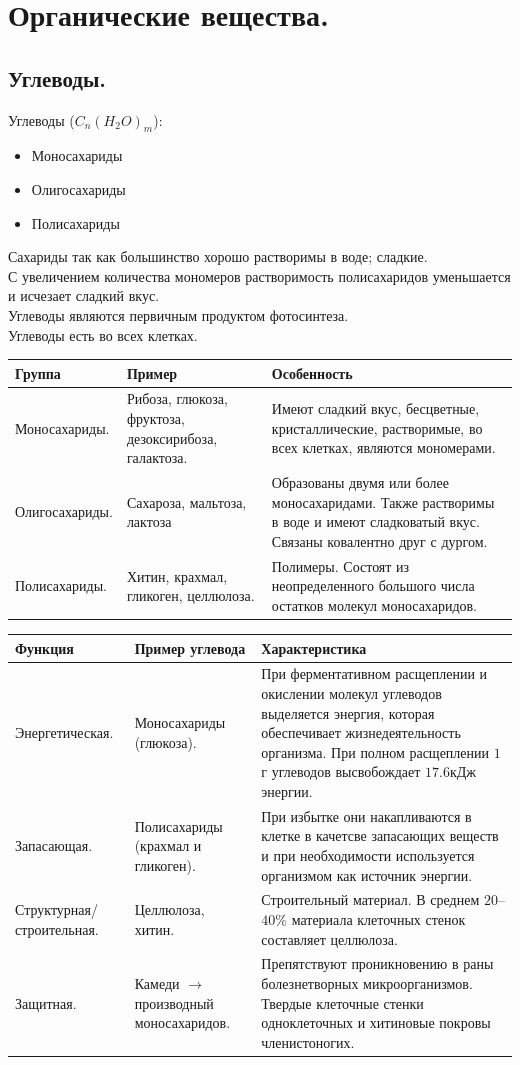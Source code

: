 \documentclass[12pt]{article}
\begin{document}
	\section{Органические вещества.}
	\subsection{Углеводы.}
	Углеводы ($C_n(H_2O)_m$):
	\begin{itemize}
		\item Моносахариды
		\item Олигосахариды
		\item Полисахариды
	\end{itemize}
	Сахариды так как большинство хорошо растворимы в воде; сладкие. \\
	С увеличением количества мономеров растворимость полисахаридов уменьшается и исчезает сладкий вкус. \\
	Углеводы являются первичным продуктом фотосинтеза. \\
	Углеводы есть во всех клетках.
	\begin{xltabular}{\textwidth}{|X|X|X|}
		\hline
		Группа & Пример & Особенность \\
		\hline
		Моносахариды. & Рибоза, глюкоза, фруктоза, дезоксирибоза, галактоза. & Имеют сладкий вкус, бесцветные, кристаллические, растворимые, во всех клетках, являются мономерами. \\
		\hline
		Олигосахариды. & Сахароза, мальтоза, лактоза & Образованы двумя или более моносахаридами. Также растворимы в воде и имеют сладковатый вкус. Связаны ковалентно друг с дургом. \\
		\hline
		Полисахариды. & Хитин, крахмал, гликоген, целлюлоза. & Полимеры. Состоят из неопределенного большого числа остатков молекул моносахаридов. \\
		\hline
	\end{xltabular}
	\begin{xltabular}{\textwidth}{|X|X|X|}
		\hline
		Функция & Пример углевода & Характеристика \\
		\hline
		Энергетическая. & Моносахариды (глюкоза). & При ферментативном расщеплении и окислении молекул углеводов выделяется энергия, которая обеспечивает жизнедеятельность организма. При полном расщеплении $1$г углеводов высвобождает $17.6$кДж энергии. \\
		\hline
		Запасающая. & Полисахариды (крахмал и гликоген). & При избытке они накапливаются в клетке в качетсве запасающих веществ и при необходимости используется организмом как источник энергии. \\
		\hline
		Структурная/строительная. & Целлюлоза, хитин. & Строительный материал. В среднем $20$--$40\%$ материала клеточных стенок составляет целлюлоза. \\
		\hline
		Защитная. & Камеди $\rightarrow$ производный моносахаридов. & Препятствуют проникновению в раны болезнетворных микроорганизмов. Твердые клеточные стенки одноклеточных и хитиновые покровы членистоногих. \\
		\hline
	\end{xltabular}
\end{document}
